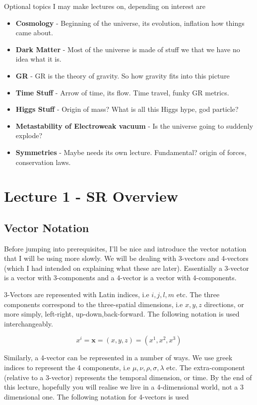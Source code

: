Optional topics I may make lectures on, depending on interest are 

\begin{itemize}
  \item \textbf{Cosmology} - Beginning of the universe, its evolution, inflation how things came about. 
  \item \textbf{Dark Matter} - Most of the universe is made of stuff we that we have no idea what it is. 
  \item \textbf{GR} - GR is the theory of gravity. So how gravity fits into this picture
  \item \textbf{Time Stuff} - Arrow of time, its flow. Time travel, funky GR metrics. 
  \item \textbf{Higgs Stuff} - Origin of mass? What is all this Higgs hype, god particle?
  \item \textbf{Metastability of Electroweak vacuum} - Is the universe going to suddenly explode?
  \item \textbf{Symmetries} - Maybe needs its own lecture. Fundamental? origin of forces, conservation laws. 
\end{itemize}


\section{Lecture 1 - SR Overview}

\subsection{Vector Notation}
Before jumping into prerequisites, I'll be nice and introduce the vector notation that I will be using more slowly. We will be dealing with 3-vectors and 4-vectors (which I had intended on explaining what these are later). Essentially a 3-vector is a vector with 3-components and a 4-vector is a vector with 4-components. 

3-Vectors are represented with Latin indices, i.e $i,j,l,m$ etc. The three components correspond to the three-spatial dimensions, i.e $x,y,z$ directions, or more simply, left-right, up-down,back-forward. The following notation is used interchangeably. 

\begin{equation}
  x^i = \mathbf{x} = (x,y,z) = (x^1, x^2,x^3)
\end{equation}

Similarly, a 4-vector can be represented in a number of ways. We use greek indices to represent the 4 components, i.e $\mu,\nu,\rho,\sigma,\lambda$ etc. The extra-component (relative to a 3-vector) represents the temporal dimension, or time. By the end of this lecture, hopefully you will realise we live in a 4-dimensional world, not a 3 dimensional one. The following notation for 4-vectors is used

